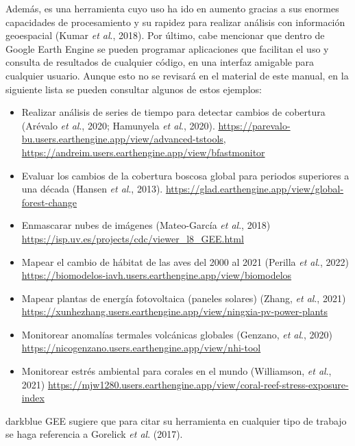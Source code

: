 \documentclass[
  12pt,
  letterpaper,
  twoside]{book}
\providecommand{\tightlist}{%
  \setlength{\itemsep}{0pt}\setlength{\parskip}{0pt}}
\begin{document}
Además, es una herramienta cuyo uso ha ido en aumento gracias a sus enormes capacidades de procesamiento y su rapidez para realizar análisis con información geoespacial (Kumar \emph{et al}., 2018). Por último, cabe mencionar que dentro de Google Earth Engine se pueden programar aplicaciones que facilitan el uso y consulta de resultados de cualquier código, en una interfaz amigable para cualquier usuario. Aunque esto no se revisará en el material de este manual, en la siguiente lista se pueden consultar algunos de estos ejemplos:

\begin{itemize}
\tightlist
\item
  Realizar análisis de series de tiempo para detectar cambios de cobertura (Arévalo \emph{et al}., 2020; Hamunyela \emph{et al}., 2020). \url{https://parevalo-bu.users.earthengine.app/view/advanced-tstools}, \url{https://andreim.users.earthengine.app/view/bfastmonitor}
\item
  Evaluar los cambios de la cobertura boscosa global para periodos superiores a una década (Hansen \emph{et al}., 2013). \url{https://glad.earthengine.app/view/global-forest-change}
\item
  Enmascarar nubes de imágenes (Mateo-García \emph{et al}., 2018) \url{https://isp.uv.es/projects/cdc/viewer_l8_GEE.html}
\item
  Mapear el cambio de hábitat de las aves del 2000 al 2021 (Perilla \emph{et al}., 2022) \url{https://biomodelos-iavh.users.earthengine.app/view/biomodelos}
\item
  Mapear plantas de energía fotovoltaica (paneles solares) (Zhang, \emph{et al}., 2021) \url{https://xunhezhang.users.earthengine.app/view/ningxia-pv-power-plants}
\item
  Monitorear anomalías termales volcánicas globales (Genzano, \emph{et al}., 2020) \url{https://nicogenzano.users.earthengine.app/view/nhi-tool}
\item
  Monitorear estrés ambiental para corales en el mundo (Williamson, \emph{et al}., 2021) \url{https://mjw1280.users.earthengine.app/view/coral-reef-stress-exposure-index}
\end{itemize}

\begin{bluebox2}

\begin{awesomeblock}{5pt}{\faLightbulb}{darkblue}
GEE sugiere que para citar su herramienta en cualquier tipo de trabajo se haga referencia a Gorelick \emph{et al}. (2017).

\end{awesomeblock}

\end{bluebox2}
\end{document}
